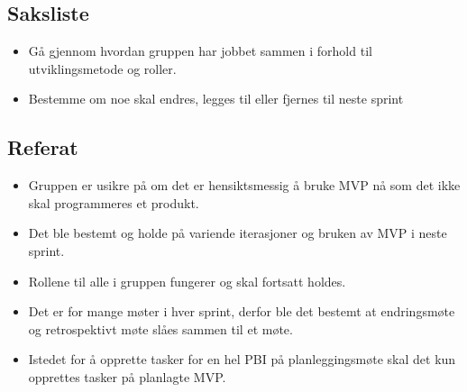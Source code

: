 \subsection{Saksliste}
\begin{itemize}
\item Gå gjennom hvordan gruppen har jobbet sammen i forhold til utviklingsmetode og roller. 
\item Bestemme om noe skal endres, legges til eller fjernes til neste sprint 
\end{itemize}


\subsection{Referat}
\begin{itemize}
\item Gruppen er usikre på om det er hensiktsmessig å bruke MVP nå som det ikke skal programmeres et produkt.
\item Det ble bestemt og holde på variende iterasjoner og bruken av MVP i neste sprint. 
\item Rollene til alle i gruppen fungerer og skal fortsatt holdes.  
\item Det er for mange møter i hver sprint, derfor ble det bestemt at endringsmøte og retrospektivt møte slåes sammen til et møte. 
\item Istedet for å opprette tasker for en hel PBI på planleggingsmøte skal det kun opprettes tasker på planlagte MVP.
\end{itemize}

